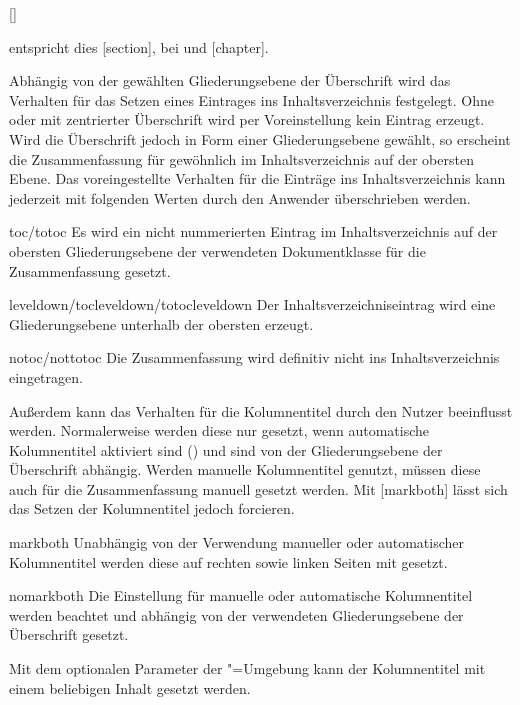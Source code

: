 \begin{Declaration}{[\PSet]}
\begin{values}
   entspricht dies [section], bei 
   und  [chapter].
\end{values}
%
Abhängig von der gewählten Gliederungsebene der Überschrift wird das Verhalten 
für das Setzen eines Eintrages ins Inhaltsverzeichnis festgelegt. Ohne oder mit 
zentrierter Überschrift wird per Voreinstellung kein Eintrag erzeugt. Wird die 
Überschrift jedoch in Form einer Gliederungsebene gewählt, so erscheint die 
Zusammenfassung für gewöhnlich im Inhaltsverzeichnis auf der obersten Ebene. 
Das voreingestellte Verhalten für die Einträge ins Inhaltsverzeichnis kann 
jederzeit mit folgenden Werten durch den Anwender überschrieben werden.
%
\begin{values}
\item[toc/totoc]
  Es wird ein nicht nummerierten Eintrag im Inhaltsverzeichnis auf der obersten 
  Gliederungsebene der verwendeten Dokumentklasse für die Zusammenfassung 
  gesetzt.
\item[leveldown/tocleveldown/totocleveldown]
  Der Inhaltsverzeichniseintrag wird eine Gliederungsebene unterhalb der 
  obersten erzeugt.
\item[notoc/nottotoc]
  Die Zusammenfassung wird definitiv nicht ins Inhaltsverzeichnis eingetragen.
\end{values}
%
Außerdem kann das Verhalten für die Kolumnentitel durch den Nutzer beeinflusst 
werden. Normalerweise werden diese nur gesetzt, wenn automatische Kolumnentitel 
aktiviert sind () und sind von der Gliederungsebene der 
Überschrift abhängig. Werden manuelle Kolumnentitel genutzt, müssen diese auch 
für die Zusammenfassung manuell gesetzt werden. Mit [markboth] 
lässt sich das Setzen der Kolumnentitel jedoch forcieren.
%
\begin{values}
\item[markboth]
  Unabhängig von der Verwendung manueller oder automatischer Kolumnentitel 
  werden diese auf rechten sowie linken Seiten mit  gesetzt.
\item[nomarkboth]
  Die Einstellung für manuelle oder automatische Kolumnentitel werden beachtet 
  und abhängig von der verwendeten Gliederungsebene der Überschrift gesetzt.
\end{values}
%
Mit dem optionalen Parameter  der 
"=Umgebung kann der Kolumnentitel mit einem beliebigen 
Inhalt gesetzt werden.


\end{Declaration}
